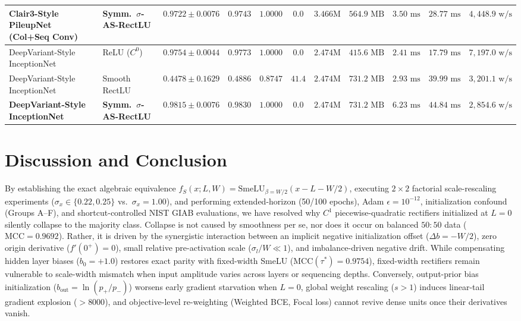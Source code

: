 \documentclass[10pt,a4paper]{article}
\begin{document}
\begin{table}[t]
\begin{tabular}{llccccccccc}
\textbf{Clair3-Style PileupNet (Col+Seq Conv)} & \textbf{Symm.\ $\sigma$-AS-RectLU} & $\mathbf{0.9722 \pm 0.0076}$ & $\mathbf{0.9743}$ & $\mathbf{1.0000}$ & $\mathbf{0.0}$ & $3.466\text{M}$ & $564.9\text{ MB}$ & $3.50\text{ ms}$ & $28.77\text{ ms}$ & $4,448.9\text{ w/s}$ \\
\midrule
DeepVariant-Style InceptionNet & ReLU ($C^0$) & $0.9754 \pm 0.0044$ & $0.9773$ & $1.0000$ & $0.0$ & $2.474\text{M}$ & $415.6\text{ MB}$ & $2.41\text{ ms}$ & $17.79\text{ ms}$ & $7,197.0\text{ w/s}$ \\
DeepVariant-Style InceptionNet & Smooth RectLU & $0.4478 \pm 0.1629$ & $0.4886$ & $0.8747$ & $41.4$ & $2.474\text{M}$ & $731.2\text{ MB}$ & $2.93\text{ ms}$ & $39.99\text{ ms}$ & $3,201.1\text{ w/s}$ \\
\textbf{DeepVariant-Style InceptionNet} & \textbf{Symm.\ $\sigma$-AS-RectLU} & $\mathbf{0.9815 \pm 0.0076}$ & $\mathbf{0.9830}$ & $\mathbf{1.0000}$ & $\mathbf{0.0}$ & $2.474\text{M}$ & $731.2\text{ MB}$ & $6.23\text{ ms}$ & $44.84\text{ ms}$ & $2,854.6\text{ w/s}$ \\
\bottomrule
\end{tabular}
\end{table}

\section{Discussion and Conclusion}
By establishing the exact algebraic equivalence $f_S(x; L, W) = \text{SmeLU}_{\beta=W/2}(x - L - W/2)$, executing $2 \times 2$ factorial scale-rescaling experiments ($\sigma_x \in \{0.22, 0.25\}$ vs.\ $\sigma_x=1.00$), and performing extended-horizon (50/100 epochs), Adam $\epsilon = 10^{-12}$, initialization confound (Groups A--F), and shortcut-controlled NIST GIAB evaluations, we have resolved why $C^1$ piecewise-quadratic rectifiers initialized at $L=0$ silently collapse to the majority class. Collapse is not caused by smoothness per se, nor does it occur on balanced $50:50$ data ($\text{MCC}=0.9692$). Rather, it is driven by the synergistic interaction between an implicit negative initialization offset ($\Delta b = -W/2$), zero origin derivative ($f'(0^+)=0$), small relative pre-activation scale ($\sigma_l / W \ll 1$), and imbalance-driven negative drift. While compensating hidden layer biases ($b_0 = +1.0$) restores exact parity with fixed-width SmeLU ($\text{MCC}(\tau^*) = 0.9754$), fixed-width rectifiers remain vulnerable to scale-width mismatch when input amplitude varies across layers or sequencing depths. Conversely, output-prior bias initialization ($b_{\text{out}} = \ln(p_+/p_-)$) worsens early gradient starvation when $L=0$, global weight rescaling ($s > 1$) induces linear-tail gradient explosion ($>8000$), and objective-level re-weighting (Weighted BCE, Focal loss) cannot revive dense units once their derivatives vanish.
\end{document}
